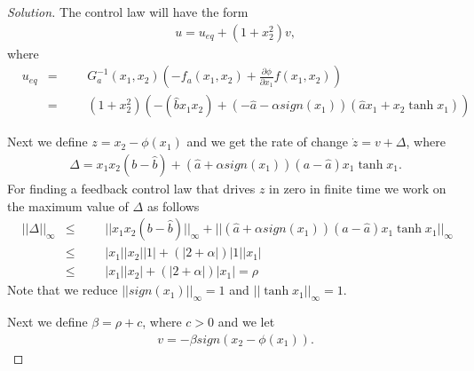 \documentclass[12pt]{article}
\newenvironment{solution}{\begin{proof}[Solution]}{\end{proof}}
\begin{document}
\begin{solution}
The control law will have the form
\begin{align}\label{control}
&u= u_{eq}+(1+x_2^2)v,
\end{align} 
where 
\begin{equation}\label{controlEq}
\begin{aligned}
&u_{eq}
&= 
&&& G_a^{-1}(x_1,x_2)(-f_a(x_1,x_2)+\frac{\partial \phi}{\partial x_1}f(x_1,x_2)) \\
&&= 
&&& (1+x_2^2)(-(\hat{b}x_1x_2)+(-\hat{a}-\alpha sign(x_1))(\hat{a}x_1+x_2 \tanh x_1))
\end{aligned}
\end{equation}

Next we define $z=x_2- \phi (x_1)$ and we get the rate of change $\dot{z}=v + \Delta$, where
\begin{align}
&\Delta = x_1x_2(b-\hat{b})+(\hat{a}+\alpha sign(x_1))(a-\hat{a})x_1 \tanh x_1.
\end{align}
For finding a feedback control law that drives $z$ in zero in finite time we work on the maximum value of $\Delta$ as follows
\begin{equation*}
\begin{aligned}
& || \Delta||_{\infty}
& \leq 
&&& ||x_1x_2(b-\hat{b})||_{\infty}+||(\hat{a}+\alpha sign(x_1))(a-\hat{a})x_1 \tanh x_1||_{\infty}\\
&&\leq
&&& |x_1 | |x_2| |1|+ (|2+\alpha|) |1||x_1|\\
&&\leq
&&& |x_1 | |x_2|+ (|2+\alpha|)|x_1|= \rho
\end{aligned}
\end{equation*}
Note that we reduce $|| sign(x_1)||_{\infty}=1$ and  $|| \tanh x_1||_{\infty}=1$.

Next we define $\beta = \rho +c$, where $c>0$ and we let 
\begin{align}\label{controlv}
&v= - \beta sign(x_2- \phi(x_1)).
\end{align}


\end{solution}
\end{document}
